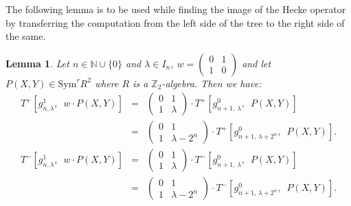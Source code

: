 \documentclass[11pt, reqno]{amsart}
\numberwithin{equation}{section}
\newcommand\N{\mathbb{N}}
\newcommand{\Z}{\mathbb{Z}}
\newcommand\Sym{{\mathrm {Sym}}}
\newtheorem{lemma}[thm]{Lemma}
\theoremstyle{definition}
\theoremstyle{remark}
\theoremstyle{definition}
\theoremstyle{remark}
\theoremstyle{remark}
\begin{document}
The following lemma is to be used while finding the image of the Hecke operator by transferring the computation from the left side of the tree to the right side of the same.
\begin{lemma}\label{T+toT-}
    Let $n \in \N \cup \{0\}$ and $\lambda \in I_{n}$, $w=\left(\begin{smallmatrix}
        0 & 1\\
        1 & 0
    \end{smallmatrix}\right)$ and let $P(X,Y)\in \Sym^rR^2$ where $R$ is a $\Z_{2}$-algebra. Then we have:  \begin{eqnarray}T^+\left[g_{n,\lambda}^{1}, \enspace w \cdot P(X,Y)\right]&=&\left(\begin{smallmatrix}
    0 & 1\\
    1 & \lambda
\end{smallmatrix}\right)\cdot T^+\left[g_{n+1,\,\lambda}^{0},\enspace P(X,Y)\right]
   \label{T+toT-a}\\
   &=&\left(\begin{smallmatrix}
        0 & 1\\
        1 & \lambda -2^n
\end{smallmatrix}\right)\cdot T^+\left[g_{n+1,\, \lambda+2^n}^{0},\enspace P(X,Y)\right].\label{T+toT-b}\\
T^-\left[g_{n,\lambda}^1, \enspace w \cdot P(X,Y)\right] &=& \left(\begin{smallmatrix}
       0&1\\
       1&\lambda
   \end{smallmatrix}\right)\cdot T^-\left[g_{n+1,\,\lambda}^{0}, \enspace P(X,Y)\right]
   \label{T+toT-c}\\
   &=& \left(\begin{smallmatrix}
       0 & 1\\
       1 & \lambda-2^n
   \end{smallmatrix}\right)\cdot T^-\left[g_{n+1,\,\lambda+2^n}^{0},\enspace P(X,Y)\right]. \label{T+toT-d}
  \end{eqnarray} 
    \end{lemma}
\end{document}
